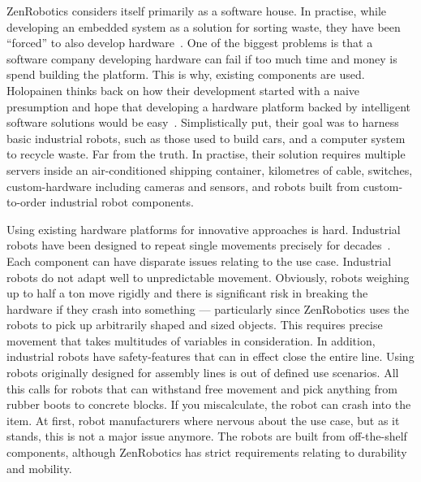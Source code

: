 \documentclass[english]{tktltiki2}
\begin{document}
ZenRobotics considers itself primarily as a software house. In practise, while developing an embedded system as a solution for sorting waste, they have been “forced” to also develop hardware~\cite{Hol15a}. One of the biggest problems is that a software company developing hardware can fail if too much time and money is spend building the platform. This is why, existing components are used. Holopainen thinks back on how their development started with a naive presumption and hope that developing a hardware platform backed by intelligent software solutions would be easy~\cite{Hol15a}. Simplistically put, their goal was to harness basic industrial robots, such as those used to build cars, and a computer system to recycle waste. Far from the truth. In practise, their solution requires multiple servers inside an air-conditioned shipping container, kilometres of cable, switches, custom-hardware including cameras and sensors, and robots built from custom-to-order industrial robot components.

Using existing hardware platforms for innovative approaches is hard. Industrial robots have been designed to repeat single movements precisely for decades~\cite{Hol15a}. Each component can have disparate issues relating to the use case. Industrial robots do not adapt well to unpredictable movement. Obviously, robots weighing up to half a ton move rigidly and there is significant risk in breaking the hardware if they crash into something — particularly since ZenRobotics uses the robots to pick up arbitrarily shaped and sized objects. This requires precise movement that takes multitudes of variables in consideration. In addition, industrial robots have safety-features that can in effect close the entire line. Using robots originally designed for assembly lines is out of defined use scenarios. All this calls for robots that can withstand free movement and pick anything from rubber boots to concrete blocks. If you miscalculate, the robot can crash into the item. At first, robot manufacturers where nervous about the use case, but as it stands, this is not a major issue anymore. The robots are built from off-the-shelf components, although ZenRobotics has strict requirements relating to durability and mobility.
\end{document}
